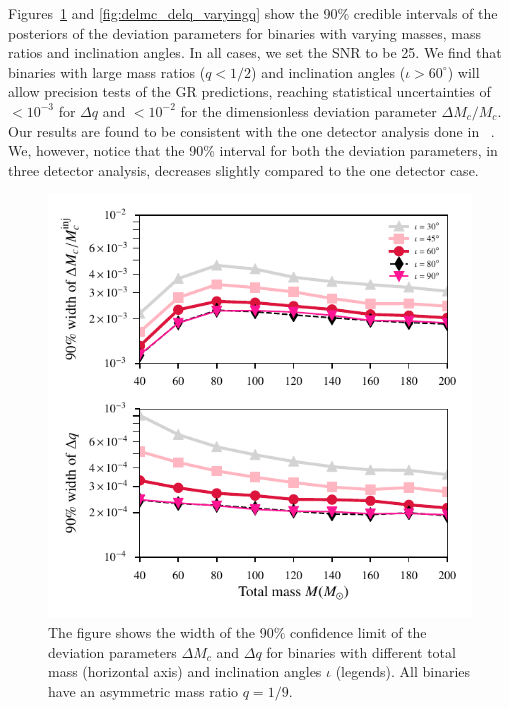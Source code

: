 \documentclass[prd,preprintnumbers,twocolumn,eqsecnum,floatfix,a4paper,nofootinbib,superscriptaddress]{revtex4}
\begin{document}
 Figures~\ref{fig:delmc_delq_varyingM} and \ref{fig:delmc_delq_varyingq} show the 90\% credible intervals of the posteriors of the deviation parameters for binaries with varying masses, mass ratios and inclination angles. In all cases, we set the SNR to be {25}.  We find that binaries with large mass ratios ($q < 1/ 2$) and inclination angles ($\iota > 60 ^\circ $) will allow precision tests of the GR predictions, reaching statistical uncertainties of $< 10^{-3}$ for $\Delta q$ and $< 10^{-2}$ for the dimensionless deviation parameter $\Delta M_c/M_c$. Our results are found to be consistent with the one detector analysis done in ~\cite{dhanpal2018}. We, however, notice that the 90\% interval for both the deviation parameters, in three detector analysis, decreases slightly compared to the one detector case.
 
 \begin{figure}[tbh]
 	\begin{center}
 		\includegraphics[scale=0.8]{figs/hm_9dim_dmcbymcinj_dq_diff_M.pdf}
 	\end{center} 
 	\caption{The figure shows the width of the 90$\%$ confidence limit of the deviation parameters $\Delta M_c$ and $\Delta q$ for binaries with different total mass (horizontal axis) and inclination angles $\iota$ (legends). All binaries have an asymmetric mass ratio $q=1/9$.}
 	\label{fig:delmc_delq_varyingM}
 \end{figure}
 
\end{document}
